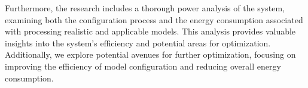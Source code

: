 Furthermore, the research includes a thorough power analysis of the system, examining both the configuration process and the energy consumption associated with processing realistic and applicable models.
This analysis provides valuable insights into the system's efficiency and potential areas for optimization.
Additionally, we explore potential avenues for further optimization, focusing on improving the efficiency of model configuration and reducing overall energy consumption.

